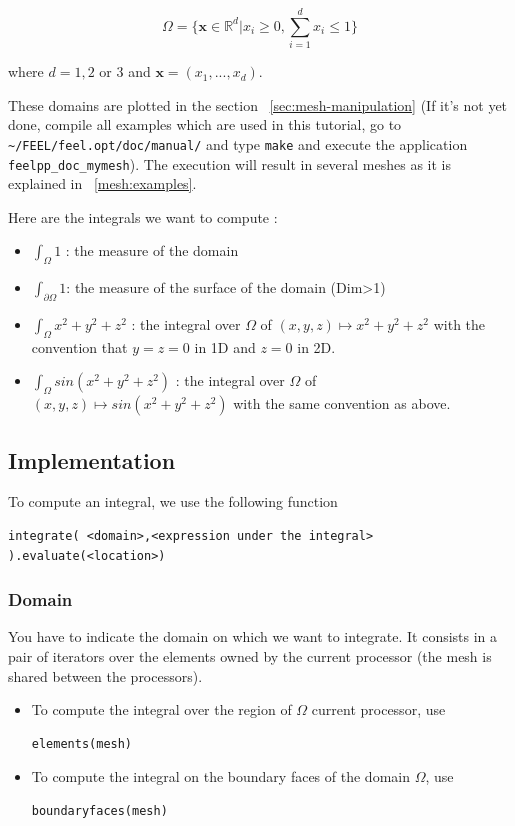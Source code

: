 \[ \Omega=\{ \mathbf{x} \in \mathbb{R}^d | x_i \geq 0, \sum_{i=1}^{d} x_i \leq 1 \} \]

where $ d=1,2$ or $3$ and $\mathbf{x}=(x_1,...,x_d)$.

These domains are plotted in the section ~\ref{sec:mesh-manipulation} (If it's
not yet done, compile all examples which are used in this tutorial, go to
\lstinline!~/FEEL/feel.opt/doc/manual/! and type \verb|make| and execute the
application \verb|feelpp_doc_mymesh|). The execution will result in several meshes
as it is explained in ~\ref{mesh:examples}.

Here are the integrals we want to compute :
\begin{itemize}
\item $\displaystyle{ \int_\Omega 1 }$ : the measure of the domain
\item $\displaystyle{ \int_{\partial\Omega} 1 }$: the measure of the surface of the domain (Dim>1)
\item $ \displaystyle{\int_{\Omega} x^2+y^2+z^2 }$ : the integral over $\displaystyle{\Omega}$ of $ \displaystyle{(x,y,z) \mapsto x^2+y^2+z^2}$ with the convention that $y=z=0$ in 1D and $ z=0 $ in 2D.
\item $\displaystyle{ \int_{\Omega} sin(x^2+y^2+z^2)} $ : the integral over $\Omega$ of $\displaystyle{ (x,y,z) \mapsto sin(x^2+y^2+z^2)}$ with the same convention as above.
\end{itemize}

\subsection{Implementation}

To compute an integral, we use the following function
\begin{lstlisting}
integrate( <domain>,<expression under the integral> ).evaluate(<location>)
\end{lstlisting}

\subsubsection{Domain}

You have to indicate the domain on which we want to integrate. It consists in a pair of iterators over the elements owned by the current processor (the mesh is shared between the processors).
\begin{itemize}
\item To compute the integral over the region of $\Omega$ current processor, use
\begin{lstlisting}
elements(mesh)
\end{lstlisting}
\item To compute the integral on the boundary faces of the domain $\Omega$, use
\begin{lstlisting}
boundaryfaces(mesh)
\end{lstlisting}
\end{itemize}

